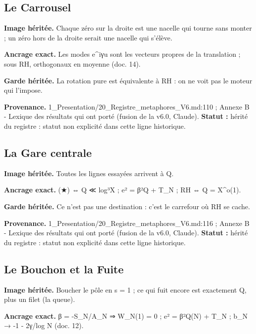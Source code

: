 \documentclass[
  9pt,
  a4paper,
]{article}
\begin{document}
\hypertarget{le-carrousel}{%
\subsection{Le Carrousel}\label{le-carrousel}}

\textbf{Image héritée.} Chaque zéro sur la droite est une nacelle qui
tourne sans monter ; un zéro hors de la droite serait une nacelle qui
s'élève.

\textbf{Ancrage exact.} Les modes e\^{}iγu sont les vecteurs propres de
la translation ; sous RH, orthogonaux en moyenne (doc. 14).

\textbf{Garde héritée.} La rotation pure est équivalente à RH : on ne
voit pas le moteur qui l'impose.

\textbf{Provenance.} 1\_Presentation/20\_Registre\_metaphores\_V6.md:110
; Annexe B - Lexique des résultats qui ont porté (fusion de la v6.0,
Claude). \textbf{Statut :} hérité du registre : statut non explicité
dans cette ligne historique.

\hypertarget{la-gare-centrale}{%
\subsection{La Gare centrale}\label{la-gare-centrale}}

\textbf{Image héritée.} Toutes les lignes essayées arrivent à Q.

\textbf{Ancrage exact.} (★) ⇔ Q ≪ log³X ; e² = β²Q + T\_N ; RH ⇔ Q =
X\^{}o(1).

\textbf{Garde héritée.} Ce n'est pas une destination : c'est le
carrefour où RH se cache.

\textbf{Provenance.} 1\_Presentation/20\_Registre\_metaphores\_V6.md:116
; Annexe B - Lexique des résultats qui ont porté (fusion de la v6.0,
Claude). \textbf{Statut :} hérité du registre : statut non explicité
dans cette ligne historique.

\hypertarget{le-bouchon-et-la-fuite}{%
\subsection{Le Bouchon et la Fuite}\label{le-bouchon-et-la-fuite}}

\textbf{Image héritée.} Boucher le pôle en s = 1 ; ce qui fuit encore
est exactement Q, plus un filet (la queue).

\textbf{Ancrage exact.} β = -S\_N/A\_N ⇒ W\_N(1) = 0 ; e² = β²Q(N) +
T\_N ; b\_N → -1 - 2γ/log N (doc. 12).
\end{document}
